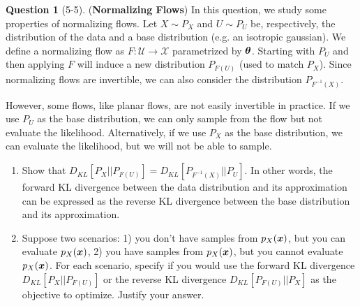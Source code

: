 \documentclass[12pt]{article}
\theoremstyle{definition}
\newtheorem{exercise}{Question}%
\begin{document}
\begin{exercise}[5-5] (\textbf{Normalizing Flows})
In this question, we study some properties of normalizing flows. Let $X \sim P_X$ and $U \sim P_U$ be, respectively, the distribution of the data and a base distribution (e.g. an isotropic gaussian). We define a normalizing flow as $F: \mathcal{U} \rightarrow \mathcal{X}$ parametrized by ${\bm{\theta}}$. Starting with $P_U$ and then applying $F$ will induce a new distribution $P_{F(U)}$ (used to match $P_X$). Since normalizing flows are invertible, we can also consider the distribution $P_{F^{-1}(X)}$.

However, some flows, like planar flows, are not easily invertible in practice. If we use $P_U$ as the base distribution, we can only sample from the flow but not evaluate the likelihood. Alternatively, if we use $P_X$ as the base distribution, we can evaluate the likelihood, but we will not be able to sample.

\begin{enumerate}[label=\arabic{exercise}.\arabic*]
    \item Show that $D_{KL}[P_X || P_{F(U)}] = D_{KL}[P_{F^{-1}(X)} || P_U]$. In other words, the forward KL divergence between the data distribution and its approximation can be expressed as the reverse KL divergence between the base distribution and its approximation. 
    \item Suppose two scenarios: 1) you don't have samples from $p_X({\bm{x}})$, but you can evaluate $p_X({\bm{x}})$, 2) you have samples from $p_X({\bm{x}})$, but you cannot evaluate $p_X({\bm{x}})$. For each scenario, specify if you would use the forward KL divergence $D_{KL}[P_X || P_{F(U)}]$ or the reverse KL divergence $D_{KL}[P_{F(U)} || P_X]$ as the objective to optimize. Justify your answer.
\end{enumerate}

\end{exercise}
\end{document}
